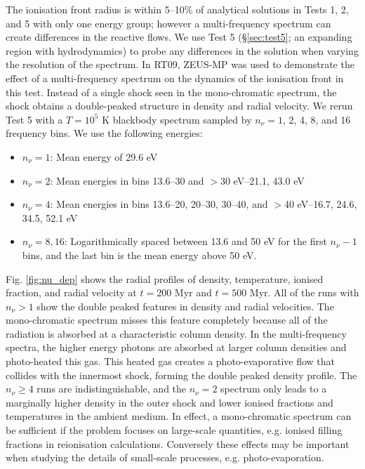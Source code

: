 \documentclass[useAMS,usenatbib]{mn2e}
\begin{document}
The ionisation front radius is within 5--10\% of analytical solutions
in Tests 1, 2, and 5 with only one energy group; however a
multi-frequency spectrum can create differences in the reactive flows.
We use Test 5 (\S\ref{sec:test5}; an expanding \hii region with
hydrodynamics) to probe any differences in the solution when varying
the resolution of the spectrum.  In RT09, ZEUS-MP was used to
demonstrate the effect of a multi-frequency spectrum on the dynamics
of the ionisation front in this test.  Instead of a single shock seen
in the mono-chromatic spectrum, the shock obtains a double-peaked
structure in density and radial velocity.  We rerun Test 5 with a
$T=10^5$ K blackbody spectrum sampled by $n_\nu = 1$, 2, 4, 8, and 16
frequency bins.  We use the following energies:
%
\begin{itemize}
\item $n_\nu = 1$: Mean energy of 29.6 eV
\item $n_\nu = 2$: Mean energies in bins 13.6--30 and $>$30 eV--21.1,
  43.0 eV
\item $n_\nu = 4$: Mean energies in bins 13.6--20, 20--30, 30--40, and
  $>$40 eV--16.7, 24.6, 34.5, 52.1 eV
\item $n_\nu = 8, 16$: Logarithmically spaced between 13.6 and 50 eV
  for the first $n_\nu-1$ bins, and the last bin is the mean energy
  above 50 eV.
\end{itemize}

Fig. \ref{fig:nu_dep} shows the radial profiles of density,
temperature, ionised fraction, and radial velocity at $t = 200$ Myr
and $t = 500$ Myr.  All of the runs with $n_\nu > 1$ show the double
peaked features in density and radial velocities.  The mono-chromatic
spectrum misses this feature completely because all of the radiation
is absorbed at a characteristic column density.  In the
multi-frequency spectra, the higher energy photons are absorbed at
larger column densities and photo-heated this gas.  This heated gas
creates a photo-evaporative flow that collides with the innermost
shock, forming the double peaked density profile.  The $n_\nu \ge 4$
runs are indistinguishable, and the $n_\nu = 2$ spectrum only leads to
a marginally higher density in the outer shock and lower ionised
fractions and temperatures in the ambient medium.  In effect, a
mono-chromatic spectrum can be sufficient if the problem focuses on
large-scale quantities, e.g. ionised filling fractions in reionisation
calculations.  Conversely these effects may be important when studying
the details of small-scale processes, e.g. photo-evaporation.
\end{document}
